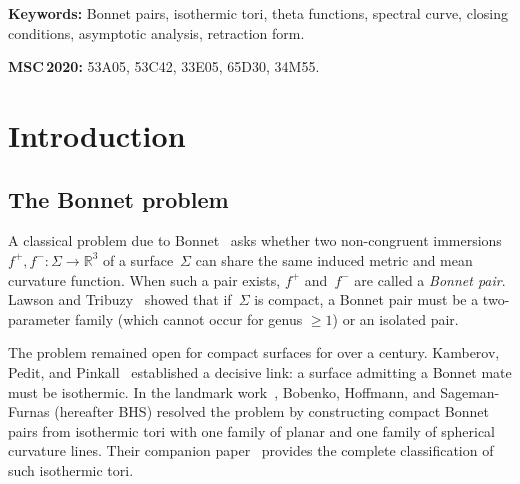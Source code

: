 \documentclass[11pt,a4paper]{article}
\theoremstyle{plain}
\theoremstyle{definition}
\theoremstyle{remark}
\newcommand{\RR}{\mathbb{R}}
\begin{document}
\smallskip
\noindent\textbf{Keywords:}
  Bonnet pairs, isothermic tori, theta functions, spectral curve,
  closing conditions, asymptotic analysis, retraction form.

\smallskip
\noindent\textbf{MSC\,2020:}
  53A05, 53C42, 33E05, 65D30, 34M55.

\section{Introduction}\label{sec:intro}

\subsection{The Bonnet problem}
A classical problem due to Bonnet~\cite{Bon67} asks whether two
non-congruent immersions $f^+, f^- \colon \Sigma \to \RR^3$ of a
surface~$\Sigma$ can share the same induced metric and mean curvature
function.  When such a pair exists, $f^+$ and~$f^-$ are called a
\emph{Bonnet pair}.  Lawson and Tribuzy~\cite{LT81} showed that
if~$\Sigma$ is compact, a Bonnet pair must be a two-parameter family
(which cannot occur for genus $\geq 1$) or an isolated pair.

The problem remained open for compact surfaces for over a century.
Kamberov, Pedit, and Pinkall~\cite{KPP98} established a decisive link:
a surface admitting a Bonnet mate must be isothermic.  In the landmark
work~\cite{BHS25}, Bobenko, Hoffmann, and Sageman-Furnas (hereafter
BHS) resolved the problem by constructing compact Bonnet pairs
from isothermic tori with one family of planar and one family of
spherical curvature lines.  Their companion paper~\cite{BHS-comp}
provides the complete classification of such isothermic tori.
\end{document}
